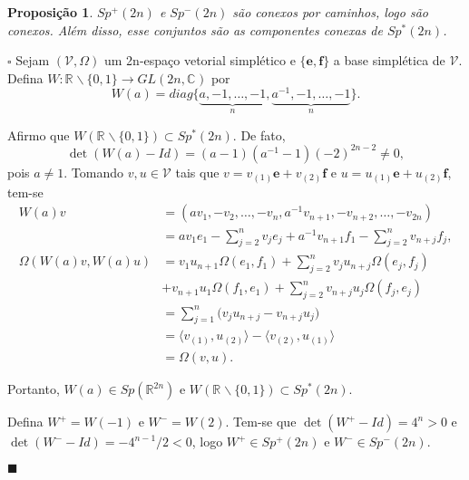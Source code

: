\documentclass[12pt]{book}
\newtheorem{proposicao}[teorema]{Proposição}
\newenvironment{prova}[1]{$\square$ #1}{\hfill$\blacksquare$}
\newcommand{\bigparenteses}[1]{\Big( #1 \Big) }
\newcommand{\complementar}[2]{#1 \backslash #2}
\newcommand{\complexificado}[1]{\mathcal{#1}}
\newcommand{\complexo}[1]{\mathbb{C}^{#1}}
\newcommand{\formaSimpleticaExtendida}[2]{\Omega(#1, #2)}
\newcommand{\generalgroup}[2]{GL(#1, #2)}
\newcommand{\generalgroupcomplexo}[1]{\generalgroup{#1}{\complexo{}}}
\newcommand{\gruposimpletico}[1]{Sp(#1)}
\newcommand{\gruposimpleticonaodegenerado}[1]{Sp^{#1}(2n)}
\newcommand{\produtointerno}[2]{\langle #1, #2 \rangle}
\newcommand{\real}[1]{\mathbb{R}^{#1}}
\newcommand{\reta}{\real{}}
\begin{document}
	\begin{proposicao}\label{proposicao_desconexidade_grupo_simpletico_nao_degenerado}
		$ \gruposimpleticonaodegenerado{+}$ e $\gruposimpleticonaodegenerado{-}$ são conexos por caminhos, logo são conexos. Além disso, esse conjuntos são as componentes conexas de $\gruposimpleticonaodegenerado{*} $.
	\end{proposicao}
	\begin{prova}
		Sejam $(\complexificado{V}, \Omega)$ um 2n-espaço vetorial simplético e $\{\textbf{e}, \textbf{f}\}$ a base simplética de $\complexificado{V}$. Defina $W: \complementar{\reta}{\{0,1\}} \to \generalgroupcomplexo{2n}$ por
		$$
		W(a) = diag\{\underbrace{a, -1, \dots, -1}_{n}, \underbrace{a^{-1}, -1, \dots , -1}_{n}\}.
		$$
		
		Afirmo que $W(\complementar{\reta}{\{0,1\}}) \subset \gruposimpleticonaodegenerado{*}$. De fato, 
		$$
		\det(W(a)- Id) = (a-1)(a^{-1}-1)(-2)^{2n-2} \neq 0,
		$$
		pois $a\neq 1$. Tomando $v,u \in \complexificado{V}$ tais que $v=v_{(1)}\textbf{e}+ v_{(2)}\textbf{f}$ e $u=u_{(1)}\textbf{e}+ u_{(2)}\textbf{f}$, tem-se 
		$$
		\begin{aligned}	
		W(a)v &= (av_{1}, -v_{2}, \dots, -v_{n}, a^{-1}v_{n+1}, -v_{n+2}, \dots, -v_{2n})
		\\
		&= av_{1}e_{1}  -\sum_{j=2}^{n} v_{j}e_{j} + a^{-1}v_{n+1}f_{1} -\sum_{j=2}^{n} v_{n+j}f_{j},
		\\
		\formaSimpleticaExtendida{W(a)v}{W(a)u} 
		&=v_{1}u_{n+1}\formaSimpleticaExtendida{e_{1}}{f_{1}} + \sum_{j=2}^{n}v_{j}u_{n+j}\formaSimpleticaExtendida{e_{j}}{f_{j}}
		\\
		&+v_{n+1}u_{1}\formaSimpleticaExtendida{f_{1}}{e_{1}} + \sum_{j=2}^{n} v_{n+j}u_{j}\formaSimpleticaExtendida{f_{j}}{e_{j}}
		\\
		&=\sum_{j=1}^{n}\bigparenteses{v_{j}u_{n+j} - 	v_{n+j}u_{j}}
		\\
		&= \produtointerno{v_{(1)}}{u_{(2)}} - \produtointerno{v_{(2)}}{u_{(1)}}
		\\
		&= \formaSimpleticaExtendida{v}{u}.
		\end{aligned}
		$$ 
		
		Portanto, $W(a) \in \gruposimpletico{\real{2n}}$ e $W(\complementar{\reta}{\{0,1\}}) \subset \gruposimpleticonaodegenerado{*}$.
		
		Defina $W^{+} = W(-1)$ e $W^{-} = W(2)$. Tem-se que $\det(W^{+} - Id) = 4^{n}>0$  e $\det(W^{-} - Id) = -4^{n-1}/2 <0$, logo $W^{+}\in \gruposimpleticonaodegenerado{+}$ e $W^{-}\in \gruposimpleticonaodegenerado{-}$. 
		

\end{prova}
\end{document}
